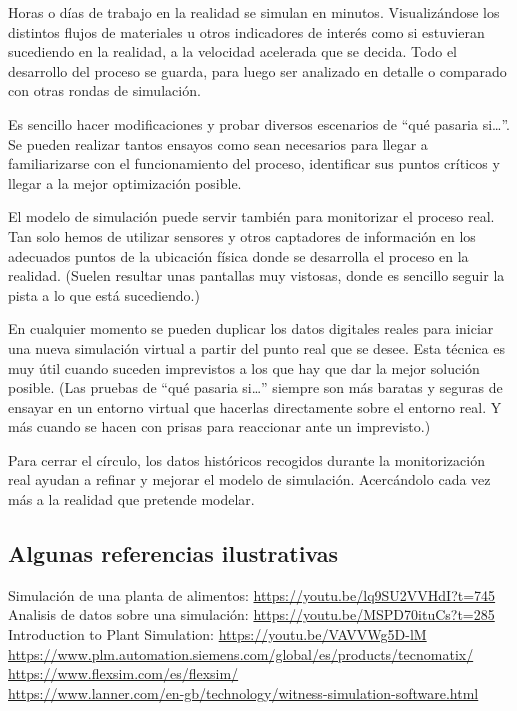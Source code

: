 \documentclass[spanish,12pt,a4paper,final,oneside]{book}
\begin{document}
Horas o días de trabajo en la realidad se simulan en minutos. Visualizándose los distintos flujos de materiales u otros indicadores de interés como si estuvieran sucediendo en la realidad, a la velocidad acelerada que se decida. Todo el desarrollo del proceso se guarda, para luego ser analizado en detalle o comparado con otras rondas de simulación. 

Es sencillo hacer modificaciones y probar diversos escenarios de ``qué pasaria si\ldots''. Se pueden realizar tantos ensayos como sean necesarios para llegar a familiarizarse con el funcionamiento del proceso, identificar sus puntos críticos y llegar a la mejor optimización posible.

El modelo de simulación puede servir también para monitorizar el proceso real. Tan solo hemos de utilizar sensores y otros captadores de información en los adecuados puntos de la ubicación física donde se desarrolla el proceso en la realidad. (Suelen resultar unas pantallas muy vistosas, donde es sencillo seguir la pista a lo que está sucediendo.)

En cualquier momento se pueden duplicar los datos digitales reales para iniciar una nueva simulación virtual a partir del punto real que se desee. Esta técnica es muy útil cuando suceden imprevistos a los que hay que dar la mejor solución posible. (Las pruebas de ``qué pasaria si\ldots'' siempre son más baratas y seguras de ensayar en un entorno virtual que hacerlas directamente sobre el entorno real. Y más cuando se hacen con prisas para reaccionar ante un imprevisto.)

Para cerrar el círculo, los datos históricos recogidos durante la monitorización real ayudan a refinar y mejorar el modelo de simulación. Acercándolo cada vez más a la realidad que pretende modelar.


\subsection*{Algunas referencias ilustrativas}
Simulación de una planta de alimentos: \url{https://youtu.be/lq9SU2VVHdI?t=745}
\\Analisis de datos sobre una simulación: \url{https://youtu.be/MSPD70ituCs?t=285}
\\Introduction to Plant Simulation: \url{https://youtu.be/VAVVWg5D-lM}
\\ \url{https://www.plm.automation.siemens.com/global/es/products/tecnomatix/}
\\ \url{https://www.flexsim.com/es/flexsim/}
\\ \url{https://www.lanner.com/en-gb/technology/witness-simulation-software.html}
\end{document}
